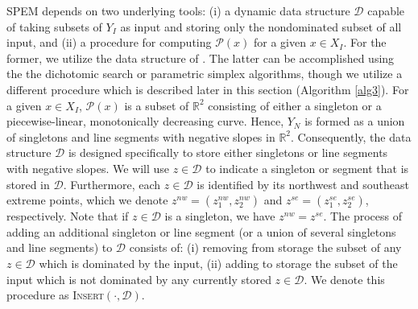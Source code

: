 \documentclass[12pt]{article}
\newcommand{\R}{\mathbb{R}}
\begin{document}
SPEM depends on two underlying tools: (i) a dynamic data structure $\mathscr{D}$ capable of taking subsets of $Y_I$ as input and storing only the nondominated subset of all input, and (ii) a procedure for computing $\mathcal{P}(x)$ for a given $x \in X_I$. For the former, we utilize the data structure of \citet{adelgren2014}. The latter can be accomplished using the the dichotomic search \citep{cohon1978multiobjective,aneja1979bicriteria} or parametric simplex \citep{zeleny1974linear,ehrgott2005multicriteria} algorithms, though we utilize a different procedure which is described later in this section (Algorithm \ref{alg3}). For a given $x \in X_I$, $\mathcal{P}(x)$ is a subset of $\R^2$ consisting of either a singleton or a piecewise-linear, monotonically decreasing curve. Hence, $Y_N$ is formed as a union of singletons and line segments with negative slopes in $\R^2$. Consequently, the data structure $\mathscr{D}$ is designed specifically to store either singletons or line segments with negative slopes. We will use $z \in \mathscr{D}$ to indicate a singleton or segment that is stored in $\mathscr{D}$. Furthermore, each $z \in \mathscr{D}$ is identified by its northwest and southeast extreme points, which we denote $z^{nw} = (z^{nw}_1,z^{nw}_2)$ and $z^{se} = (z^{se}_1,z^{se}_2)$, respectively. Note that if $z \in \mathscr{D}$ is a singleton, we have $z^{nw} = z^{se}$. The process of adding an additional singleton or line segment (or a union of several singletons and line segments) to $\mathscr{D}$ consists of: (i) removing from storage the subset of any $z \in \mathscr{D}$ which is dominated by the input, (ii) adding to storage the subset of the input which is not dominated by any currently stored $z \in \mathscr{D}$. We denote this procedure as \textsc{Insert}$(\cdot,\mathscr{D})$.
\end{document}
